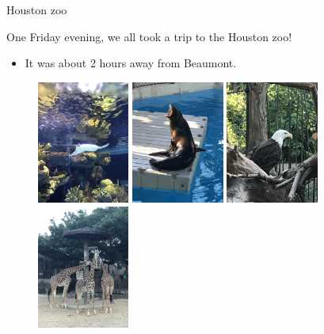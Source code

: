 \documentclass[8pt]{beamer}
\begin{document}
\begin{frame}{Houston zoo}

One Friday evening, we all took a trip to the Houston zoo!
\begin{itemize}
    \item It was about 2 hours away from Beaumont.
\end{itemize}

\begin{figure}
    \centering
    \includegraphics[width = 0.27\textwidth, angle = 270, origin = c]{zoo1.JPG} \hspace{0.15cm}
    \includegraphics[width = 0.27\textwidth, angle = 270, origin = c]{zoo2.JPG} \hspace{0.15cm}
    \includegraphics[width = 0.27\textwidth, angle = 270, origin = c]{zoo3.JPG} \hspace{0.15cm}
    \includegraphics[width = 0.27\textwidth, angle = 270, origin = c]{zoo5.JPG}
\end{figure}
    
\end{frame}
\end{document}
